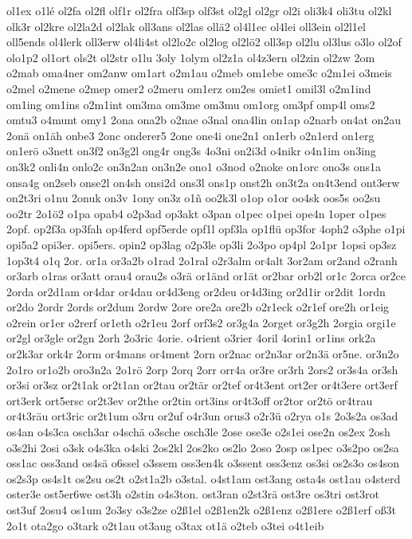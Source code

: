 {ol1ex
o1lé
ol2fa
ol2fl
olf1r
ol2fra
olf3sp
olf3st
ol2gl
ol2gr
ol2i
oli3k4
oli3tu
ol2kl
olk3r
ol2kre
ol2la2d
ol2lak
oll3ans
ol2las
ollä2
ol4l1ec
ol4lei
oll3ein
ol2l1el
oll5ends
ol4lerk
oll3erw
ol4li4st
ol2lo2c
ol2log
ol2lö2
oll3sp
ol2lu
ol3lus
o3lo
ol2of
olo1p2
ol1ort
ols2t
ol2str
o1lu
3oly
1olym
ol2z1a
ol4z3ern
ol2zin
ol2zw
2om
o2mab
oma4ner
om2anw
om1art
o2m1au
o2meb
om1ebe
ome3c
o2m1ei
o3meis
o2mel
o2mene
o2mep
omer2
o2meru
om1erz
om2es
omiet1
omil3l
o2m1ind
om1ing
om1ins
o2m1int
om3ma
om3me
om3mu
om1org
om3pf
omp4l
oms2
omtu3
o4munt
omy1
2ona
ona2b
o2nae
o3nal
ona4lin
on1ap
o2narb
on4at
on2au
2onä
on1äh
onbe3
2onc
onderer5
2one
one4i
one2n1
on1erb
o2n1erd
on1erg
on1erö
o3nett
on3f2
on3g2l
ong4r
ong3s
4o3ni
on2i3d
o4nikr
o4n1im
on3ing
on3k2
onli4n
onlo2c
on3n2an
on3n2e
ono1
o3nod
o2noke
on1orc
ono3s
ons1a
onsa4g
on2seb
onse2l
on4sh
onsi2d
ons3l
ons1p
onst2h
on3t2a
on4t3end
ont3erw
on2t3ri
o1nu
2onuk
on3v
1ony
on3z
o1ñ
oo2k3l
o1op
o1or
oo4sk
oos5s
oo2su
oo2tr
2o1ö2
o1pa
opab4
o2p3ad
op3akt
o3pan
o1pec
o1pei
ope4n
1oper
o1pes
2opf.
op2f3a
op3fah
op4ferd
opf5erde
opf1l
opf3la
op1flü
op3for
4oph2
o3phe
o1pi
opi5a2
opi3er.
opi5ers.
opin2
op3lag
o2p3le
op3li
2o3po
op4pl
2o1pr
1opsi
op3sz
1op3t4
o1q
2or.
or1a
or3a2b
o1rad
2o1ral
o2r3alm
or4alt
3or2am
or2and
o2ranh
or3arb
o1ras
or3att
orau4
orau2s
o3rä
or1änd
or1ät
or2bar
orb2l
or1c
2orca
or2ce
2orda
or2d1am
or4dar
or4dau
or4d3eng
or2deu
or4d3ing
or2d1ir
or2dit
1ordn
or2do
2ordr
2ords
or2dum
2ordw
2ore
ore2a
ore2b
o2r1eck
o2r1ef
ore2h
or1eig
o2rein
or1er
o2rerf
or1eth
o2r1eu
2orf
orf3s2
or3g4a
2orget
or3g2h
2orgia
orgi1e
or2gl
or3gle
or2gn
2orh
2o3ric
4orie.
o4rient
o3rier
4oril
4orin1
or1ins
ork2a
or2k3ar
ork4r
2orm
or4mans
or4ment
2orn
or2nac
or2n3ar
or2n3ä
or5ne.
or3n2o
2o1ro
or1o2b
oro3n2a
2o1rö
2orp
2orq
2orr
orr4a
or3re
or3rh
2ors2
or3s4a
or3sh
or3si
or3sz
or2t1ak
or2t1an
or2tau
or2tär
or2tef
or4t3ent
ort2er
or4t3ere
ort3erf
ort3erk
ort5ersc
or2t3ev
or2the
or2tin
ort3ins
or4t3off
or2tor
or2tö
or4trau
or4t3räu
ort3ric
or2t1um
o3ru
or2uf
o4r3un
orus3
o2r3ü
o2rya
o1s
2o3s2a
os3ad
os4an
o4s3ca
osch3ar
o4schä
o3sche
osch3le
2ose
ose3e
o2s1ei
ose2n
os2ex
2osh
o3s2hi
2osi
o3sk
o4s3ka
o4ski
2os2kl
2os2ko
os2lo
2oso
2osp
os1pec
o3s2po
os2sa
oss1ac
oss3and
os4sä
o6ssel
o3ssem
oss3en4k
o3ssent
oss3enz
os3si
os2s3o
os4son
os2s3p
os4s1t
os2su
os2t
o2st1a2b
o3stal.
o4st1am
ost3ang
osta4s
ost1au
o4sterd
oster3e
ost5er6we
ost3h
o2stin
o4s3ton.
ost3ran
o2st3rä
ost3re
os3tri
ost3rot
ost3uf
2osu4
os1um
2o3sy
o3s2ze
o2ß1el
o2ß1en2k
o2ß1enz
o2ß1ere
o2ß1erf
oß3t
2o1t
ota2go
o3tark
o2t1au
ot3aug
o3tax
ot1ä
o2teb
o3tei
o4t1eib
}
